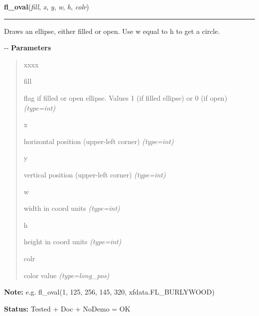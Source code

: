 \hspace{.8\funcindent}\begin{boxedminipage}{\funcwidth}

    \raggedright \textbf{fl\_oval}(\textit{fill}, \textit{x}, \textit{y}, \textit{w}, \textit{h}, \textit{colr})

    \vspace{-1.5ex}

    \rule{\textwidth}{0.5\fboxrule}
\setlength{\parskip}{2ex}

Draws an ellipse, either filled or open. Use w equal to h to get a
circle.

-{}-
\setlength{\parskip}{1ex}
      \textbf{Parameters}
      \vspace{-1ex}

      \begin{quote}
        \begin{Ventry}{xxxx}

          \item[fill]


flag if filled or open ellipse. Values 1 (if filled ellipse) or 0
(if open)
            {\it (type=int)}

          \item[x]


horizontal position (upper-left corner)
            {\it (type=int)}

          \item[y]


vertical position (upper-left corner)
            {\it (type=int)}

          \item[w]


width in coord units
            {\it (type=int)}

          \item[h]


height in coord units
            {\it (type=int)}

          \item[colr]


color value
            {\it (type=long\_pos)}

        \end{Ventry}

      \end{quote}

\textbf{Note:} 
e.g. fl\_oval(1, 125, 256, 145, 320, xfdata.FL\_BURLYWOOD)


\textbf{Status:} 
Tested + Doc + NoDemo = OK


    \end{boxedminipage}

